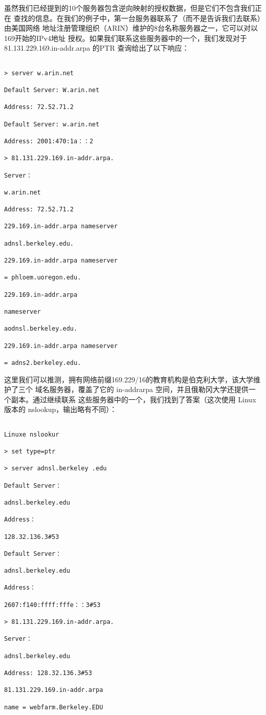 虽然我们已经提到的10个服务器包含逆向映射的授权数据，但是它们不包含我们正在
查找的信息。在我们的例子中，第一台服务器联系了（而不是告诉我们去联系）由美国网络
地址注册管理组织（ARIN）维护的8台名称服务器之一，它可以对以 169开始的IPv4地址
授权。如果我们联系这些服务器中的一个，我们发现对于81.131.229.169.in-addr.arpa 的PTR
查询给出了以下响应：
\begin{verbatim}
    
> server w.arin.net

Default Server: W.arin.net

Address: 72.52.71.2

Default Server: w.arin.net

Address: 2001:470:1a：：2

> 81.131.229.169.in-addr.arpa.

Server：

w.arin.net

Address: 72.52.71.2

229.169.in-addr.arpa nameserver

adnsl.berkeley.edu.

229.169.in-addr.arpa nameserver

= phloem.uoregon.edu.

229.169.in-addr.arpa

nameserver

aodnsl.berkeley.edu.

229.169.in-addr.arpa nameserver

= adns2.berkeley.edu.
\end{verbatim}

这里我们可以推测，拥有网络前缀169.229/16的教育机构是伯克利大学，该大学维护了三个
域名服务器，覆盖了它的 in-addrarpa 空间，并且俄勒冈大学还提供一个副本。通过继续联系
这些服务器中的一个，我们找到了答案（这次使用 Linux版本的 nslookup，输出略有不同）：

\begin{verbatim}
    
Linuxe nslookur

> set type=ptr

> server adnsl.berkeley .edu

Default Server：

adnsl.berkeley.edu

Address：

128.32.136.3#53

Default Server：

adnsl.berkeley.edu

Address：

2607:f140:ffff:fffe：：3#53

> 81.131.229.169.in-addr.arpa.

Server：

adnsl.berkeley.edu

Address: 128.32.136.3#53

81.131.229.169.in-addr.arpa

name = webfarm.Berkeley.EDU
\end{verbatim}

